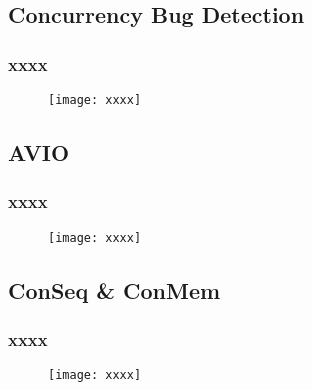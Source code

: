\subsection{Concurrency Bug Detection} %
\begin{frame}[fragile]
    \frametitle{xxxx}
    \begin{figure}
    \texttt{[image: xxxx]}
    \end{figure}
\end{frame}
\subsection{AVIO} %
\begin{frame}[fragile]
    \frametitle{xxxx}
    \begin{figure}
    \texttt{[image: xxxx]}
    \end{figure}
\end{frame}
\subsection{ConSeq \& ConMem} %
\begin{frame}[fragile]
    \frametitle{xxxx}
    \begin{figure}
    \texttt{[image: xxxx]}
    \end{figure}
\end{frame}

